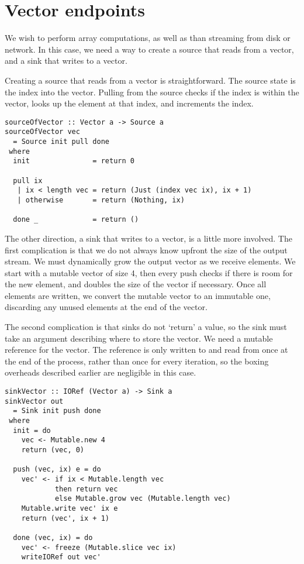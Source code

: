 \section{Vector endpoints}

We wish to perform array computations, as well as than streaming from disk or network.
In this case, we need a way to create a source that reads from a vector, and a sink that writes to a vector.

Creating a source that reads from a vector is straightforward.
The source state is the index into the vector.
Pulling from the source checks if the index is within the vector, looks up the element at that index, and increments the index.

\begin{lstlisting}
sourceOfVector :: Vector a -> Source a
sourceOfVector vec
  = Source init pull done
 where
  init               = return 0

  pull ix
   | ix < length vec = return (Just (index vec ix), ix + 1)
   | otherwise       = return (Nothing, ix)

  done _             = return ()
\end{lstlisting}

The other direction, a sink that writes to a vector, is a little more involved.
The first complication is that we do not always know upfront the size of the output stream.
We must dynamically grow the output vector as we receive elements.
We start with a mutable vector of size 4, then every push checks if there is room for the new element, and doubles the size of the vector if necessary.
Once all elements are written, we convert the mutable vector to an immutable one, discarding any unused elements at the end of the vector.

The second complication is that sinks do not `return' a value, so the sink must take an argument describing where to store the vector.
We need a mutable reference for the vector.
The reference is only written to and read from once at the end of the process, rather than once for every iteration, so the boxing overheads described earlier are negligible in this case.

\begin{lstlisting}
sinkVector :: IORef (Vector a) -> Sink a
sinkVector out
  = Sink init push done
 where
  init = do
    vec <- Mutable.new 4
    return (vec, 0)

  push (vec, ix) e = do
    vec' <- if ix < Mutable.length vec
            then return vec
            else Mutable.grow vec (Mutable.length vec)
    Mutable.write vec' ix e
    return (vec', ix + 1)

  done (vec, ix) = do
    vec' <- freeze (Mutable.slice vec ix)
    writeIORef out vec'
\end{lstlisting}

